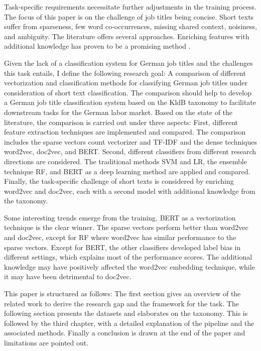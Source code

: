 \documentclass[12pt, a4paper, titlepage]{article}
\begin{document}
Task-specific requirements necessitate further adjustments in the training process. The focus of this paper is on the challenge of job titles being concise. Short texts suffer from sparseness, few word co-occurrences,  missing shared context, noisiness, and ambiguity. The literature offers several approaches. Enriching features with additional knowledge has proven to be a promising method \citep{WangF2014, wang2017J}.

Given the lack of a classification system for German job titles and the challenges this task entails, I define the following research goal: A comparison of different vectorization and classification methods for classifying German job titles under consideration of short text classification. The comparison should help to develop a German job title classification system based on the \ac{KldB} taxonomy to facilitate downstream tasks for the German labor market. Based on the state of the literature, the comparison is carried out under three aspects: First, different feature extraction techniques are implemented and compared. The comparison includes the sparse vectors count vectorizer and \ac{TF-IDF} and the dense techniques word2vec, doc2vec, and BERT. Second, different classifiers from different research directions are considered. The traditional methods SVM and LR, the ensemble technique RF, and BERT as a deep learning method are applied and compared. Finally, the task-specific challenge of short texts is considered by enriching word2vec and doc2vec, each with a second model with additional knowledge from the taxonomy. 

Some interesting trends emerge from the training. \ac{BERT} as a vectorization technique is the clear winner. The sparse vectors perform better than word2vec and doc2vec, except for \ac{RF} where word2vec has similar performance to the sparse vectors. Except for \ac{BERT}, the other classifiers developed label bias in different settings, which explains most of the performance scores. The additional knowledge may have positively affected the word2vec embedding technique, while it may have been detrimental to doc2vec. 

This paper is structured as follows: The first section gives an overview of the related work to derive the research gap and the framework for the task. The following section presents the datasets and elaborates on the taxonomy. This is followed by the third chapter, with a detailed explanation of the pipeline and the associated methods. Finally a conclusion is drawn at the end of the paper and limitations are pointed out. 
\end{document}
